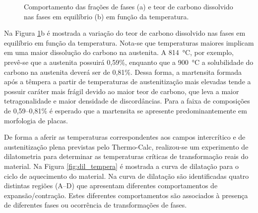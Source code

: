 \begin{figure}
  \centering
  \quad
  \caption{Comportamento das frações de fases (a) e teor de carbono dissolvido nas fases em equilíbrio (b) em função da temperatura.}
  \label{fig:thermocalc}
\end{figure}

Na Figura \ref{fig:thermocalc}b é mostrada a variação do teor de carbono dissolvido nas fases em equilíbrio em função da temperatura. Nota-se que temperaturas maiores implicam em uma maior dissolução do carbono na austenita. A \SI{814}{\degreeCelsius}, por exemplo, prevê-se que a austenita possuirá 0,59\%, enquanto que a \SI{900}{\degreeCelsius} a solubilidade do carbono na austenita deverá ser de 0,81\%. Dessa forma, a martensita formada após a têmpera a  partir de temperaturas de austenitização mais elevadas tende a possuir caráter mais frágil devido ao maior teor de carbono, que leva a maior tetragonalidade e maior densidade de discordâncias. Para a faixa de composições de 0,59--0,81\% é esperado que a martensita se apresente predominantemente em morfologia de placas.

De forma a aferir as temperaturas correspondentes aos campos intercrítico e de austenitização plena previstas pelo Thermo-Calc\textregistered{}, realizou-se um experimento de dilatometria para determinar as temperaturas críticas de transformação reais do material.
Na Figura \ref{fig:dil_tempera} é mostrada a curva de dilatação para o ciclo de aquecimento do material. Na curva de dilatação são identificadas quatro distintas regiões (A--D) que apresentam diferentes comportamentos de expansão/contração. Estes diferentes comportamentos são associados à presença de diferentes fases ou ocorrência de transformações de fases.

